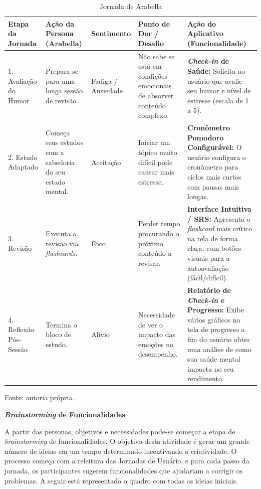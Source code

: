 \begin{table}[H]
\centering
\caption{Jornada de Arabella}
\label{tab:jornada_arabella}
\begin{tabular}{|p{2.5cm}|p{2.5cm}|p{2.8cm}|p{3cm}|p{3.5cm}|}
\hline
\textbf{Etapa da Jornada} & \textbf{Ação da Persona (Arabella)} & \textbf{Sentimento} & \textbf{Ponto de Dor / Desafio} & \textbf{Ação do Aplicativo (Funcionalidade)} \\ \hline
1. Avaliação do Humor & Prepara-se para uma longa sessão de revisão. & Fadiga / Ansiedade & Não sabe se está em condições emocionais de absorver conteúdo complexo. & \textbf{\textit{Check-in} de Saúde:} Solicita ao usuário que avalie seu humor e nível de estresse (escala de 1 a 5). \\ \hline
2. Estudo Adaptado & Começa seus estudos com a sabedoria do seu estado mental. & Aceitação & Iniciar um tópico muito difícil pode causar mais estresse. & \textbf{Cronômetro Pomodoro Configurável:} O usuário configura o cronômetro para ciclos mais curtos com pausas mais longas. \\ \hline
3. Revisão & Executa a revisão via \textit{flashcards}. & Foco & Perder tempo procurando o próximo conteúdo a revisar. & \textbf{Interface Intuitiva / SRS:} Apresenta o \textit{flashcard} mais crítico na tela de forma clara, com botões visuais para a autoavaliação (fácil/difícil). \\ \hline
4. Reflexão Pós-Sessão & Termina o bloco de estudo. & Alívio & Necessidade de ver o impacto das emoções no desempenho. & \textbf{Relatório de \textit{Check-in} e Progresso:} Exibe vários gráficos na tela de progresso a fim do usuário obter uma análise de como sua saúde mental impacta no seu rendimento. \\ \hline
\end{tabular}
\par
\vspace{0.5em}
\small Fonte: autoria própria.
\end{table}

\textbf{\textit{Brainstorming} de Funcionalidades}

A partir das personas, objetivos e necessidades pode-se começar a etapa de \textit{brainstorming} de funcionalidades.
O objetivo desta atividade é gerar um grande número de ideias em um tempo determinado incentivando a criatividade.
O processo começa com a releitura das Jornadas de Usuário, e para cada passo da jornada, os participantes sugerem funcionalidades que ajudariam a corrigir os problemas.
A seguir está representado o quadro com todas as ideias iniciais.

